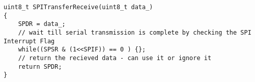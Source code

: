 \begin{verbatim}
uint8_t SPITransferReceive(uint8_t data_)
{
    SPDR = data_;
    // wait till serial transmission is complete by checking the SPI Interrupt Flag
    while((SPSR & (1<<SPIF)) == 0 ) {};
    // return the recieved data - can use it or ignore it
    return SPDR;
}
\end{verbatim}
% 